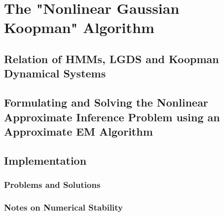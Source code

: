 \chapter{The "Nonlinear Gaussian Koopman" Algorithm}  %
	\label{c:nonlinearGaussianKoopman}


	\section{Relation of HMMs, LGDS and Koopman Dynamical Systems}


	\section{Formulating and Solving the Nonlinear Approximate Inference Problem using an Approximate EM Algorithm}


	\section{Implementation}


		\subsection{Problems and Solutions}

		\subsection{Notes on Numerical Stability}
